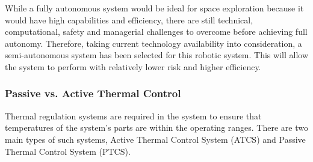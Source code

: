 \documentclass[12pt, letterpaper]{article}
\begin{document}
While a fully autonomous system would be ideal for space exploration because it would have high capabilities and efficiency, there are still technical, computational, safety and managerial challenges to overcome before achieving full autonomy. Therefore, taking current technology availability into consideration, a semi-autonomous system has been selected for this robotic system. This will allow the system to perform with relatively lower risk and higher efficiency.

\subsubsection{Passive vs. Active Thermal Control}
Thermal regulation systems are required in the system to ensure that temperatures of the system’s parts are within the operating ranges. There are two main types of such systems, Active Thermal Control System (ATCS) and Passive Thermal Control System (PTCS). 
\end{document}
